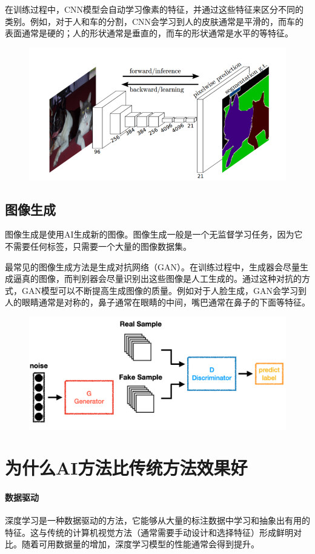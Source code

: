 \documentclass{article}
\begin{document}
在训练过程中，CNN模型会自动学习像素的特征，并通过这些特征来区分不同的类别。例如，对于人和车的分割，CNN会学习到人的皮肤通常是平滑的，而车的表面通常是硬的；人的形状通常是垂直的，而车的形状通常是水平的等特征。

\begin{figure}[htbp]
    \centering
    \includegraphics[width=.5\linewidth]{img/FCN.png}
\end{figure}

\subsection{图像生成}

图像生成是使用AI生成新的图像。图像生成一般是一个无监督学习任务，因为它不需要任何标签，只需要一个大量的图像数据集。

最常见的图像生成方法是生成对抗网络（GAN）。在训练过程中，生成器会尽量生成逼真的图像，而判别器会尽量识别出这些图像是人工生成的。通过这种对抗的方式，GAN模型可以不断提高生成图像的质量。例如对于人脸生成，GAN会学习到人的眼睛通常是对称的，鼻子通常在眼睛的中间，嘴巴通常在鼻子的下面等特征。

\begin{figure}[htbp]
    \centering
    \includegraphics[width=.5\linewidth]{img/GAN.png}
\end{figure}

\section{为什么AI方法比传统方法效果好}

\paragraph{数据驱动}
深度学习是一种数据驱动的方法，它能够从大量的标注数据中学习和抽象出有用的特征。这与传统的计算机视觉方法（通常需要手动设计和选择特征）形成鲜明对比。随着可用数据量的增加，深度学习模型的性能通常会得到提升。
\end{document}
